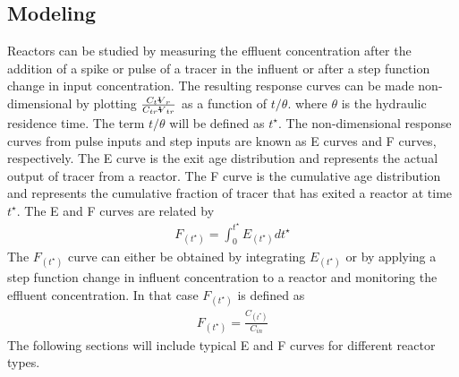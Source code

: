 \documentclass[letterpaper,10pt,english]{sphinxmanual}
\begin{document}
\subsection{Modeling}
\label{\detokenize{Reactor_Characteristics/Reactor_Characteristics:modeling}}\label{\detokenize{Reactor_Characteristics/Reactor_Characteristics:heading-reactor-modeling}}
Reactors can be studied by measuring the effluent concentration after the addition of a spike or pulse of a tracer in the influent or after a step function change in input concentration. The resulting response curves can be made non-dimensional by plotting \(\frac{C_t{\rlap{-} V }_r}{C_{tr}{\rlap{-} V }_{tr}}\) as a function of \({t/\theta}\). where \(\theta\) is the hydraulic residence time. The term \({t/\theta}\) will be defined as \(t^{\star}\). The non-dimensional response curves from pulse inputs and step inputs are known as E curves and F curves, respectively. The E curve is the exit age distribution and represents the actual output of tracer from a reactor.  The F curve is the cumulative age distribution and represents the cumulative fraction of tracer that has exited a reactor at time \(t^{\star}\). The E and F curves are related by
\begin{equation}\label{equation:Reactor_Characteristics/Reactor_Characteristics:Reactor_Characteristics/Reactor_Characteristics:0}
\begin{split}F_{\left(t^{\star} \right)} =\int _{0}^{t^{\star} }E_{\left(t^{\star} \right)} dt^{\star}\end{split}
\end{equation}
The \(F_{\left(t^{\star} \right)}\) curve can either be obtained by integrating \(E_{\left(t^{\star} \right)}\) or by applying a step function change in influent concentration to a reactor and monitoring the effluent concentration. In that case \(F_{\left(t^{\star} \right)}\) is defined as
\begin{equation}\label{equation:Reactor_Characteristics/Reactor_Characteristics:Reactor_Characteristics/Reactor_Characteristics:1}
\begin{split}F_{\left(t^\star\right)}=\frac{C_{\left(t^\star\right)}}{C_{in}}\end{split}
\end{equation}
The following sections will include typical E and F curves for different reactor types.
\end{document}
